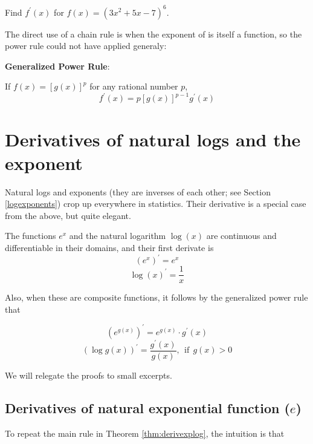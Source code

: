 \documentclass[]{book}
\theoremstyle{definition}
\theoremstyle{definition}
\theoremstyle{definition}
\theoremstyle{remark}
\let\BeginKnitrBlock\begin \let\EndKnitrBlock\end
\begin{document}
\BeginKnitrBlock{example}[Composite Exponent]
\protect\hypertarget{exm:tothesix}{}{\label{exm:tothesix} {} }Find \(f^\prime(x)\) for \(f(x) = (3x^2+5x-7)^6\).
\EndKnitrBlock{example}

The direct use of a chain rule is when the exponent of is itself a function, so the power rule could not have applied generaly:

\textbf{Generalized Power Rule}:

If \(f(x)=[g(x)]^p\) for any rational number \(p\), \[f^\prime(x) =p[g(x)]^{p-1}g^\prime(x)\]

\hypertarget{derivatives-of-natural-logs-and-the-exponent}{%
\section{Derivatives of natural logs and the exponent}\label{derivatives-of-natural-logs-and-the-exponent}}

Natural logs and exponents (they are inverses of each other; see Section \ref{logexponents}) crop up everywhere in statistics. Their derivative is a special case from the above, but quite elegant.

\BeginKnitrBlock{theorem}
\protect\hypertarget{thm:derivexplog}{}{\label{thm:derivexplog} }
The functions \(e^x\) and the natural logarithm \(\log(x)\) are continuous and differentiable in their domains, and their first derivate is
\[(e^x)^\prime = e^x\]
\[\log(x)^\prime = \frac{1}{x}\]

Also, when these are composite functions, it follows by the generalized power rule that

\[\left(e^{g(x)}\right)^\prime = e^{g(x)} \cdot g^\prime(x)\]
\[\left(\log g(x)\right)^\prime = \frac{g^\prime(x)}{g(x)}, ~~\text{if}~~ g(x) > 0\]
\EndKnitrBlock{theorem}

We will relegate the proofs to small excerpts.

\hypertarget{derivatives-of-natural-exponential-function-e}{%
\subsection*{\texorpdfstring{Derivatives of natural exponential function (\(e\))}{Derivatives of natural exponential function (e)}}\label{derivatives-of-natural-exponential-function-e}}

To repeat the main rule in Theorem \ref{thm:derivexplog}, the intuition is that
\end{document}
